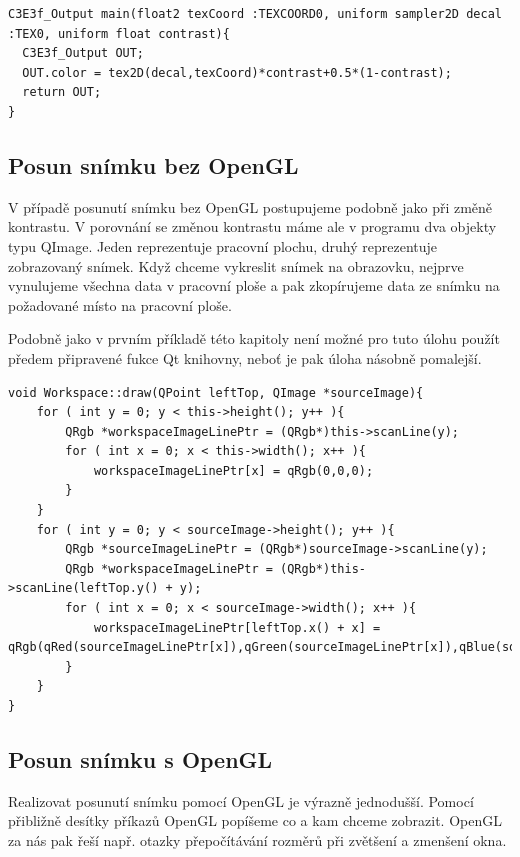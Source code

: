 \begin{lstlisting}[label=cg,caption={Program v jazyce Cg pro změnu kontrastu snímku.}]
C3E3f_Output main(float2 texCoord :TEXCOORD0, uniform sampler2D decal :TEX0, uniform float contrast){
  C3E3f_Output OUT;
  OUT.color = tex2D(decal,texCoord)*contrast+0.5*(1-contrast);
  return OUT;
}
\end{lstlisting}

\subsection{Posun snímku bez OpenGL}
V případě posunutí snímku bez OpenGL postupujeme podobně jako při změně kontrastu. V porovnání se změnou kontrastu máme ale v programu dva objekty typu QImage. Jeden reprezentuje pracovní plochu, druhý reprezentuje zobrazovaný snímek. Když chceme vykreslit snímek na obrazovku, nejprve vynulujeme všechna data v pracovní ploše a pak zkopírujeme data ze snímku na požadované místo na pracovní ploše.

Podobně jako v prvním příkladě této kapitoly není možné pro tuto úlohu použít předem připravené fukce Qt knihovny, neboť je pak úloha násobně pomalejší.

\begin{lstlisting}[caption={Funkce pro vykreslení snímku na zadanou pozici napsaná bez použití OpenGL.}]
void Workspace::draw(QPoint leftTop, QImage *sourceImage){
	for ( int y = 0; y < this->height(); y++ ){
		QRgb *workspaceImageLinePtr = (QRgb*)this->scanLine(y);
		for ( int x = 0; x < this->width(); x++ ){
			workspaceImageLinePtr[x] = qRgb(0,0,0);
		}
	}
	for ( int y = 0; y < sourceImage->height(); y++ ){
		QRgb *sourceImageLinePtr = (QRgb*)sourceImage->scanLine(y);
		QRgb *workspaceImageLinePtr = (QRgb*)this->scanLine(leftTop.y() + y);
		for ( int x = 0; x < sourceImage->width(); x++ ){
			workspaceImageLinePtr[leftTop.x() + x] = qRgb(qRed(sourceImageLinePtr[x]),qGreen(sourceImageLinePtr[x]),qBlue(sourceImageLinePtr[x]));
		}
	}
}
\end{lstlisting}


\subsection{Posun snímku s OpenGL}

Realizovat posunutí snímku pomocí OpenGL je výrazně jednodušší. Pomocí přibližně desítky příkazů OpenGL popíšeme co a kam chceme zobrazit. OpenGL za nás pak řeší např. otazky přepočítávání rozměrů při zvětšení a zmenšení okna.

